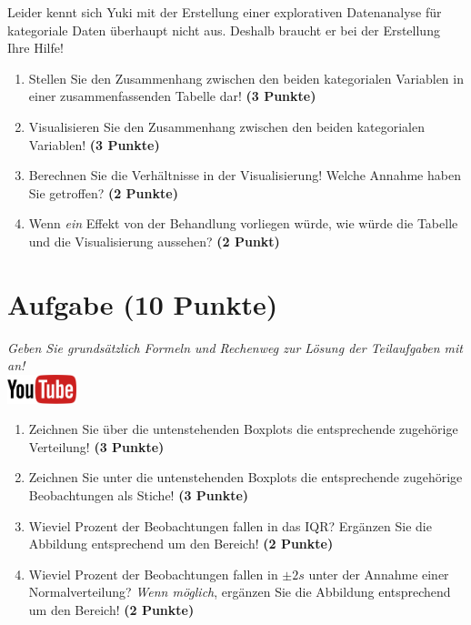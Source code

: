 \documentclass[a4paper, 9pt]{scrartcl}\usepackage[]{graphicx}\usepackage[]{xcolor}
\begin{document}
\vspace{2Ex}

Leider kennt sich Yuki mit der Erstellung einer explorativen Datenanalyse für kategoriale Daten überhaupt nicht aus. Deshalb braucht er bei der Erstellung Ihre Hilfe!

\begin{enumerate}
\item Stellen Sie den Zusammenhang zwischen den beiden kategorialen Variablen in einer zusammenfassenden Tabelle dar! \textbf{(3 Punkte)}
\item Visualisieren Sie den Zusammenhang zwischen den beiden kategorialen Variablen! \textbf{(3 Punkte)}
\item Berechnen Sie die Verhältnisse in der Visualisierung! Welche Annahme haben Sie getroffen? \textbf{(2 Punkte)}
\item Wenn \textit{ein} Effekt von der Behandlung vorliegen würde, wie würde die Tabelle und die Visualisierung aussehen? \textbf{(2 Punkt)}
\end{enumerate} 
\clearpage

\section{Aufgabe \hfill (10 Punkte)}

\textit{Geben Sie grunds{\"a}tzlich Formeln und Rechenweg zur L{\"o}sung der
  Teilaufgaben mit an!} \\[1Ex]

\hfill\href{https://youtu.be/Op-gjzASH9I}{\includegraphics[width =
  2cm]{img/youtube}}\\[1Ex]



\begin{enumerate}
\item Zeichnen Sie {\"u}ber die untenstehenden Boxplots die entsprechende
  zugeh{\"o}rige Verteilung! \textbf{(3 Punkte)} 
\item Zeichnen Sie unter die untenstehenden Boxplots die entsprechende
  zugeh{\"o}rige Beobachtungen als Stiche! \textbf{(3 Punkte)}
\item Wieviel Prozent der Beobachtungen fallen in das IQR? Erg{\"a}nzen Sie die
  Abbildung entsprechend um den Bereich! \textbf{(2 Punkte)}
\item Wieviel Prozent der Beobachtungen fallen in $\pm 2s$ unter
  der Annahme einer Normalverteilung?  \textit{Wenn m{\"o}glich}, erg{\"a}nzen Sie
  die Abbildung entsprechend um den Bereich! \textbf{(2 Punkte)}
\end{enumerate}
\end{document}
